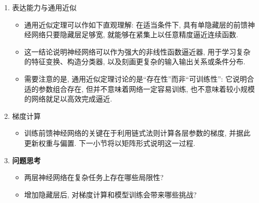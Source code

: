 \documentclass{../nndlcourse}
\begin{document}
\begin{enumerate}
\begin{itemize}
\begin{equation*}
            \boldsymbol{a}^{(l)} = f_l\left(\boldsymbol{W}^{(l)} \boldsymbol{a}^{(l-1)} + \boldsymbol{b}^{(l)}\right).
        \end{equation*}
        \item 常用记号如下:
        \begin{itemize}
            \item $L$: 除输入层外的网络层数. 
            \item $M_l$: 第 $l$ 层神经元的个数. 
            \item $f_l(\cdot)$: 第 $l$ 层的激活函数. 
            \item $\boldsymbol{W}^{(l)} \in \mathbb{R}^{M_l \times M_{l-1}}$: 第 $l-1$ 层到第 $l$ 层的权重矩阵. 
            \item $\boldsymbol{b}^{(l)} \in \mathbb{R}^{M_l}$: 第 $l$ 层的偏置向量. 
            \item $\boldsymbol{z}^{(l)} \in \mathbb{R}^{M_l}$: 第 $l$ 层的净输入, 也称净活性值. 
            \item $\boldsymbol{a}^{(l)} \in \mathbb{R}^{M_l}$: 第 $l$ 层的输出, 也称活性值. 
        \end{itemize}
    \end{itemize}
    \item 表达能力与通用近似
    \begin{itemize}
        \item 通用近似定理可以作如下直观理解: 在适当条件下, 具有单隐藏层的前馈神经网络只要隐藏层足够宽, 就能够在紧集上以任意精度逼近连续函数. 
        \item 这一结论说明神经网络可以作为强大的非线性函数逼近器, 用于学习复杂的特征变换、构造分类器, 以及刻画更复杂的输入输出关系或条件分布. 
        \item 需要注意的是, 通用近似定理讨论的是“存在性”而非“可训练性”: 它说明合适的参数组合存在, 但并不意味着网络一定容易训练, 也不意味着较小规模的网络就足以高效完成逼近. 
    \end{itemize}
    \item 梯度计算
    \begin{itemize}
        \item 训练前馈神经网络的关键在于利用链式法则计算各层参数的梯度, 并据此更新权重与偏置. 下一小节将以矩阵形式说明这一过程. 
    \end{itemize}
    \item \textbf{问题思考}
    \begin{itemize}
        \item 两层神经网络在复杂任务上存在哪些局限性?
        \item 增加隐藏层后, 对梯度计算和模型训练会带来哪些挑战?
    \end{itemize}
\end{enumerate}
\end{document}
